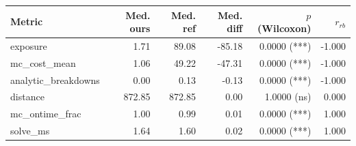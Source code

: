 \begin{tabular}{lrrrrr}
\toprule
Metric & Med. ours & Med. ref & Med. diff & $p$ (Wilcoxon) & $r_{rb}$ \\
\midrule
exposure & 1.71 & 89.08 & -85.18 & 0.0000 (***) & -1.000 \\
mc_cost_mean & 1.06 & 49.22 & -47.31 & 0.0000 (***) & -1.000 \\
analytic_breakdowns & 0.00 & 0.13 & -0.13 & 0.0000 (***) & -1.000 \\
distance & 872.85 & 872.85 & 0.00 & 1.0000 (ns) & 0.000 \\
mc_ontime_frac & 1.00 & 0.99 & 0.01 & 0.0000 (***) & 1.000 \\
solve_ms & 1.64 & 1.60 & 0.02 & 0.0000 (***) & 1.000 \\
\bottomrule
\end{tabular}
